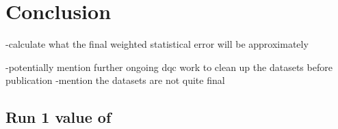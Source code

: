 
\thispagestyle{myheadings} %

\chapter{Conclusion}
\label{chapter:Conclusion}



-calculate what the final weighted statistical error will be approximately

-potentially mention further ongoing dqc work to clean up the datasets before publication
-mention the datasets are not quite final



\section{Run 1 value of \amu}
\label{sec:FinalValue}



\cleardoublepage
